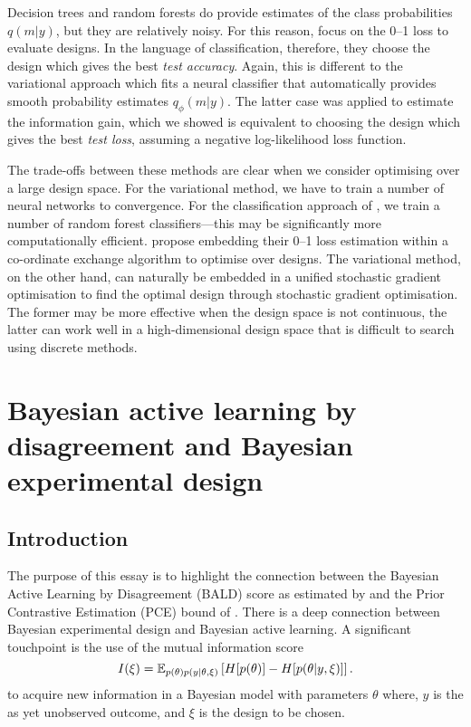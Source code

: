 \documentclass[a4paper, 10pt]{report}
\theoremstyle{plain}
\begin{document}
	Decision trees and random forests do provide estimates of the class probabilities $q(m|y)$, but they are relatively noisy.
	For this reason, \citet{hainy2018optimal} focus on the 0--1 loss to evaluate designs.
	In the language of classification, therefore, they choose the design which gives the best \emph{test accuracy}.
	Again, this is different to the variational approach which fits a neural classifier that automatically provides smooth probability estimates $q_\phi(m|y)$.
	The latter case was applied to estimate the information gain, which we showed is equivalent to choosing the design which gives the best \emph{test loss}, assuming a negative log-likelihood loss function.
	
	The trade-offs between these methods are clear when we consider optimising over a large design space.
	For the variational method, we have to train a number of neural networks to convergence. For the classification approach of \citet{hainy2018optimal}, we train a number of random forest classifiers---this may be significantly more computationally efficient.
	\citet{hainy2018optimal} propose embedding their 0--1 loss estimation within a co-ordinate exchange algorithm \citep{meyer1995coordinate} to optimise over designs.
	The variational method, on the other hand, can naturally be embedded in a unified stochastic gradient optimisation to find the optimal design through stochastic gradient optimisation.
	The former may be more effective when the design space is not continuous, the latter can work well in a high-dimensional design space that is difficult to search using discrete methods.
	
	
	
	\clearpage
	\section{Bayesian active learning by disagreement and Bayesian experimental design}
	\label{sec:balessay}
	
	\subsection{Introduction}
	The purpose of this essay is to highlight the connection between the Bayesian Active Learning by Disagreement (BALD) score as estimated by \citet{gal2017deep} and the Prior Contrastive Estimation (PCE) bound of \citet{foster2020unified}.
	There is a deep connection between Bayesian experimental design and Bayesian active learning. 
	A significant touchpoint is the use of the mutual information score \citep{lindley1956}
	\begin{equation}
	\label{eq:info}
	I(\xi) = \mathbb{E}_{p(\theta)p(y|\theta,\xi)}\left[H[p(\theta)] - H[p(\theta|y,\xi)]\right].
	\end{equation}
	to acquire new information in a Bayesian model with parameters $\theta$ where, $y$ is the as yet unobserved outcome, and $\xi$ is the design to be chosen.
	
\end{document}
